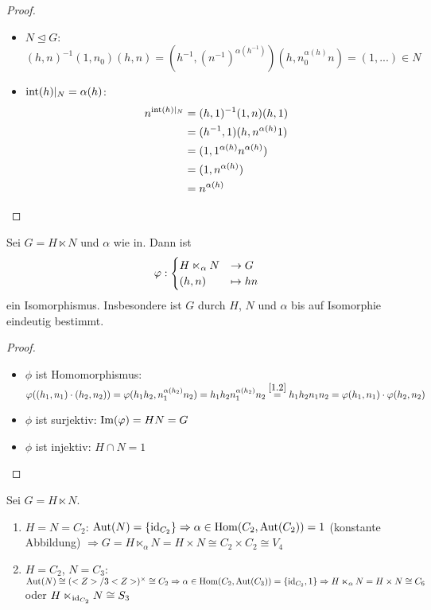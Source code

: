 \begin{proof}
\begin{itemize}
		\item $N\unlhd G$: $(h,n)^{-1}(1,n_0)(h,n)=(h^{-1},(n^{-1})^{\alpha(h^{-1})})(h,n_0^{\alpha(h)}n)=(1,...)\in N$
		\item $\Int(h)\vert_N=\alpha(h)$:
		\begin{align}
			n^{\Int(h)\vert_N} &= (h,1)^{-1} (1,n)(h,1) \notag \\
			&= (h^{-1},1)(h,n^{\alpha(h)}1) \notag \\
			&= (1,1^{\alpha(h)}n^{\alpha(h)}) \notag \\
			&= (1,n^{\alpha(h)}) \notag \\
			&= n^{\alpha(h)} \notag
		\end{align}
	\end{itemize}
\end{proof}

\begin{conclusion}
	Sei $G=H\ltimes N$ und $\alpha$ wie in. Dann ist
	\begin{align}
		\phi :\begin{cases}
		H\ltimes_{\alpha} N &\to G \\ (h,n) &\mapsto hn
		\end{cases}\notag
	\end{align}
	ein Isomorphismus. Insbesondere ist $G$ durch $H$, $N$ und $\alpha$ bis auf Isomorphie eindeutig bestimmt.
\end{conclusion}
\begin{proof}
	\begin{itemize}
		\item $\phi$ ist Homomorphismus: $\phi((h_1,n_1)\cdot (h_2,n_2)) = \phi(h_1h_2,n_1^{\alpha(h_2)}n_2) = h_1h_2n_1^{\alpha(h_2)}n_2 \overset{\eqref{1.2}}{=} h_1h_2n_1n_2 = \phi(h_1,n_1)\cdot \phi(h_2,n_2)$
		\item $\phi$ ist surjektiv: $\Image(\phi)=HN=G$
		\item $\phi$ ist injektiv: $H\cap N=1$
	\end{itemize}
\end{proof}

\begin{example}
	Sei $G=H\ltimes N$.
	\begin{enumerate}[label=(\alph*)]
		\item $H=N=C_2$: $\Aut(N)=\{\id_{C_2}\}\Rightarrow\alpha\in\Hom(C_2,\Aut(C_2))=1$ (konstante Abbildung) $\Rightarrow G = H\ltimes_{\alpha} N=H\times N\cong C_2\times C_2\cong V_4$
		\item $H=C_2$, $N=C_3$: $\Aut(N)\cong (\whole/3\whole)^\times\cong C_2 \Rightarrow \alpha\in\Hom(C_2,\Aut(C_3))=\{\id_{C_2}, 1\}\Rightarrow H\ltimes_{\alpha} N = H\times N\cong C_6$ oder $H\ltimes_{\id_{C_2}}N\cong S_3$
	\end{enumerate}
\end{example}
